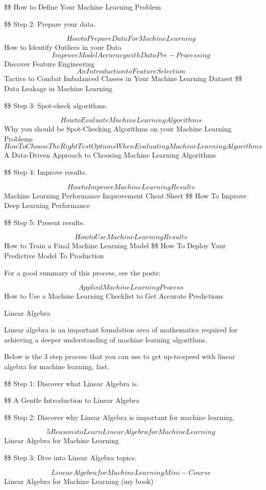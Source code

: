 \documentclass[11pt]{article}
\begin{document}
\$\$ How to Define Your Machine Learning Problem

\$\$ Step 2: Prepare your data. 

$$ How to Prepare Data For Machine Learning
 $$ How to Identify Outliers in your Data
$$ Improve Model Accuracy with Data Pre-Processing
 $$ Discover Feature Engineering
$$ An Introduction to Feature Selection
 $$ Tactics to Combat Imbalanced Classes in Your Machine Learning Dataset
\$\$ Data Leakage in Machine Learning

\$\$ Step 3: Spot-check algorithms. 

$$ How to Evaluate Machine Learning Algorithms
 $$ Why you should be Spot-Checking Algorithms on your Machine Learning Problems
$$ How To Choose The Right Test Options When Evaluating Machine Learning Algorithms
 $$ A Data-Driven Approach to Choosing Machine Learning Algorithms

\$\$ Step 4: Improve results. 

$$ How to Improve Machine Learning Results
 $$ Machine Learning Performance Improvement Cheat Sheet
\$\$ How To Improve Deep Learning Performance

\$\$ Step 5: Present results. 

$$ How to Use Machine Learning Results
 $$ How to Train a Final Machine Learning Model
\$\$ How To Deploy Your Predictive Model To Production

For a good summary of this process, see the posts:

$$ Applied Machine Learning Process
$$ How to Use a Machine Learning Checklist to Get Accurate Predictions

Linear Algebra

Linear algebra is an important foundation area of mathematics required for achieving a deeper understanding of machine learning algorithms.

Below is the 3 step process that you can use to get up-to-speed with linear algebra for machine learning, fast.

\$\$ Step 1: Discover what Linear Algebra is. 

\$\$ A Gentle Introduction to Linear Algebra

\$\$ Step 2: Discover why Linear Algebra is important for machine learning. 

$$ 5 Reasons to Learn Linear Algebra for Machine Learning
 $$ Linear Algebra for Machine Learning

\$\$ Step 3: Dive into Linear Algebra topics. 

$$ Linear Algebra for Machine Learning Mini-Course
 $$ Linear Algebra for Machine Learning (my book)
\end{document}
